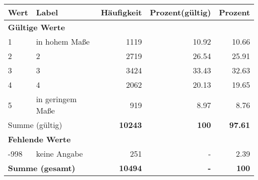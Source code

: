      \begin{longtable}{lXrrr}
     \toprule
     \textbf{Wert} & \textbf{Label} & \textbf{Häufigkeit} & \textbf{Prozent(gültig)} & \textbf{Prozent} \\
     \endhead
     \midrule
     \multicolumn{5}{l}{\textbf{Gültige Werte}}\\

     1 &
     \multicolumn{1}{X}{ in hohem Maße   } &


       \num{1119} &
       \num[round-mode=places,round-precision=2]{10.92} &
         \num[round-mode=places,round-precision=2]{10.66} \\

     2 &
     \multicolumn{1}{X}{ 2   } &


       \num{2719} &
       \num[round-mode=places,round-precision=2]{26.54} &
         \num[round-mode=places,round-precision=2]{25.91} \\

     3 &
     \multicolumn{1}{X}{ 3   } &


       \num{3424} &
       \num[round-mode=places,round-precision=2]{33.43} &
         \num[round-mode=places,round-precision=2]{32.63} \\

     4 &
     \multicolumn{1}{X}{ 4   } &


       \num{2062} &
       \num[round-mode=places,round-precision=2]{20.13} &
         \num[round-mode=places,round-precision=2]{19.65} \\

     5 &
     \multicolumn{1}{X}{ in geringem Maße   } &


       \num{919} &
       \num[round-mode=places,round-precision=2]{8.97} &
         \num[round-mode=places,round-precision=2]{8.76} \\
     \midrule
     \multicolumn{2}{l}{Summe (gültig)} &
       \textbf{\num{10243}} &
     \textbf{\num{100}} &
       \textbf{\num[round-mode=places,round-precision=2]{97.61}} \\
     \multicolumn{5}{l}{\textbf{Fehlende Werte}}\\
       -998 &
       keine Angabe &
         \num{251} &
        - &
         \num[round-mode=places,round-precision=2]{2.39} \\
     \midrule
     \multicolumn{2}{l}{\textbf{Summe (gesamt)}} &
          \textbf{\num{10494}} &
        \textbf{-} &
        \textbf{\num{100}} \\
     \bottomrule
     \end{longtable}
     
